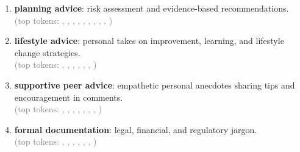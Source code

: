 \begin{enumerate}
\item[\#$-135$] \textbf{planning advice}: risk assessment and evidence-based recommendations. \\
\textcolor{gray}{(top tokens: , , , , , , , , , )}

\item[\#$-950$] \textbf{lifestyle advice}: personal takes on improvement, learning, and lifestyle change strategies. \\
\textcolor{gray}{(top tokens: , , , , , , )}

\item[\#$-860$] \textbf{supportive peer advice}: empathetic personal anecdotes sharing tips and encouragement in comments.  \\
\textcolor{gray}{(top tokens: , , , , , , , )}

\item[\#$-249$] \textbf{formal documentation}: legal, financial, and regulatory jargon. \\
\textcolor{gray}{(top tokens: , , , , , , )}


\end{enumerate}


